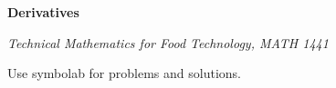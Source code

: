 \documentclass[11pt]{article}
\newcommand{\CourseName}{Technical Mathematics for Food Technology}
\newcommand{\CourseNumber}{1441}
\newcommand{\CourseName}{Technical Mathematics for Geomatics}
\newcommand{\CourseNumber}{1511}
\begin{document}
\textbf{Derivatives}

\emph{\CourseName, MATH \CourseNumber}

Use symbolab for problems and solutions.

\end{document}
